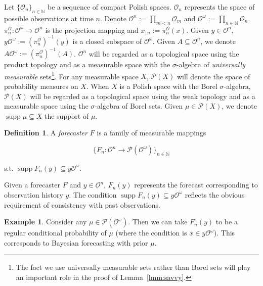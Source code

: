 \documentclass[11pt]{article}
\theoremstyle{definition}
\newtheorem{definition}{Definition}%
\newtheorem{example}{Example}%
\theoremstyle{plain}
\newcommand{\Nats}{\mathbb{N}}
\newcommand{\Sq}[2]{\{#1\}_{#2 \in \Nats}}
\newcommand{\Sqn}[1]{\Sq{#1}{n}}
\newcommand{\PM}{\mathcal{P}}
\DeclareMathOperator{\Sp}{supp}
\newcommand{\Ob}{\mathcal{O}}
\newcommand{\OO}{\Ob^\omega}
\newcommand{\PO}{\pi^\Ob}
\newcommand{\PMO}{\PM(\OO)}
\begin{document}
Let $\Sqn{\Ob_n}$ be a sequence of compact Polish spaces. $\Ob_n$ represents the space of possible observations at time $n$. Denote $\Ob^n := \prod_{m < n} \Ob_m$  and $\Ob^\omega:=\prod_{n \in \Nats} \Ob_n$. $\PO_n: \Ob^\omega \rightarrow \Ob^n$ is the projection mapping and $x_{:n}:=\PO_n\left(x\right)$. Given $y \in \Ob^n$, $y\OO := \left(\PO_n\right)^{-1}\left(y\right)$ is a closed subspace of $\OO$. Given $A\subseteq\Ob^n$, we denote $A\Ob^\omega:=\left(\PO_n\right)^{-1}(A)$. $\Ob^n$ will be regarded as a topological space using the product topology and as a measurable space with the $\sigma$-algebra of \emph{universally measurable} sets\footnote{The fact we use universally measurable sets rather than Borel sets will play an important role in the proof of Lemma~\ref{lmm:savvy}.}. For any measurable space $X$, $\PM\left(X\right)$ will denote the space of probability measures on $X$. When $X$ is a Polish space with the Borel $\sigma$-algebra, $\PM\left(X\right)$ will be regarded as a topological space using the weak topology and as a measurable space using the $\sigma$-algebra of Borel sets. Given $\mu \in \PM\left(X\right)$, we denote $\Sp \mu \subseteq X$ the support of $\mu$.

\begin{samepage}
\begin{definition}

A \emph{forecaster} $F$ is a family of measurable mappings

\[\Sqn{F_n: \Ob^n \rightarrow \PMO}\]

s.t. $\Sp {F_n\left(y\right)} \subseteq y\OO$.

\end{definition}
\end{samepage}

Given a forecaster $F$ and $y \in \Ob^n$, $F_n\left(y\right)$ represents the forecast corresponding to observation history $y$. The condition $\Sp {F_n\left(y\right)} \subseteq y\OO$ reflects the obvious requirement of consistency with past observations.

\begin{samepage}
\begin{example}

Consider any $\mu\in\PMO$. Then we can take $F_n(y)$ to be a regular conditional probability of $\mu$ (where the condition is $x \in y\OO$). This corresponds to Bayesian forecasting with prior $\mu$.

\end{example}
\end{samepage}
\end{document}
